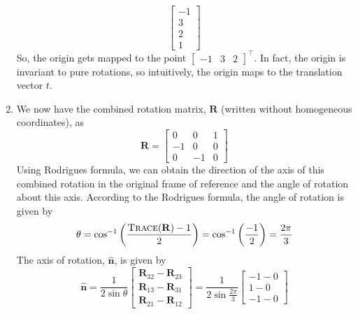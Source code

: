 \documentclass[10pt]{article}
\newcommand{\unit}[1]{\mathbf{\hat{#1}}}
\begin{document}
\begin{enumerate}
\begin{equation*}
\begin{bmatrix}
                -1 \\
                3 \\
                2 \\
                1
            \end{bmatrix}
        \end{equation*}
        So, the origin gets mapped to the point $\begin{bmatrix} -1 & 3 & 2 \end{bmatrix}^{\top}$.
        In fact, the origin is invariant to pure rotations, so intuitively, the origin maps to
        the translation vector $t$.

        \item We now have the combined rotation matrix, $\mathbf{R}$ (written without homogeneous
        coordinates), as
        \begin{equation*}
            \mathbf{R} = \begin{bmatrix}
                0 & 0 & 1 \\
                -1 & 0 & 0 \\
                0 & -1 & 0
            \end{bmatrix}
        \end{equation*}
        Using Rodrigues formula, we can obtain the direction of the axis of this combined
        rotation in the original frame of reference and the angle of rotation about this axis.
        According to the Rodrigues formula, the angle of rotation is given by
        \begin{equation*}
            \theta = \cos^{-1}{\left(\frac{\textsc{Trace}(\mathbf{R}) - 1}{2}\right)}
            = \cos^{-1}{\left(\frac{-1}{2}\right)} = \frac{2\pi}{3}
        \end{equation*}
        The axis of rotation, $\unit{n}$, is given by
        \begin{equation*}
            \unit{n} = \frac{1}{2\sin{\theta}} \begin{bmatrix}
                \mathbf{R}_{32} - \mathbf{R}_{23} \\
                \mathbf{R}_{13} - \mathbf{R}_{31} \\
                \mathbf{R}_{21} - \mathbf{R}_{12}
            \end{bmatrix}
            = \frac{1}{2\sin{\frac{2\pi}{3}}} \begin{bmatrix}
                -1 - 0 \\
                1 - 0 \\
                -1 - 0

\end{bmatrix}
\end{equation*}
\end{enumerate}
\end{document}
